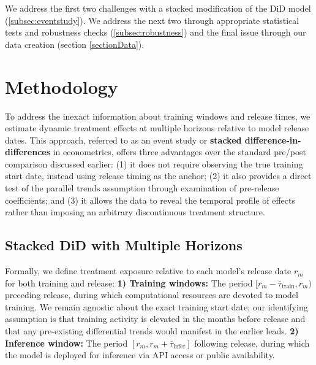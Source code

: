 \documentclass[a4paper,fleqn,longmktitle]{cas-sc}
\theoremstyle{plain}
\theoremstyle{definition}
\begin{document}
We address the first two challenges with a stacked modification of the DiD model (\autoref{subsec:eventstudy}). We address the next two through appropriate statistical tests and robustness checks (\autoref{subsec:robustness}) and the final issue through our data creation (section \ref{sectionData}). 


\section{Methodology} 

To address the inexact information about training windows and release times, we estimate dynamic treatment effects at multiple horizons relative to model release dates. This approach, referred to as an event study or \textbf{stacked difference-in-differences} in econometrics, offers three advantages over the standard pre/post comparison discussed earlier: (1) it does not require observing the true training start date, instead using release timing as the anchor; (2) it also provides a direct test of the parallel trends assumption through examination of pre-release coefficients; and (3) it allows the data to reveal the temporal profile of effects rather than imposing an arbitrary discontinuous treatment structure.

\subsection{Stacked DiD with Multiple Horizons}%
\label{subsec:eventstudy}
Formally, we define treatment exposure relative to each model's release date $r_m$ for both training and release: \textbf{1) Training windows:} The period $[r_m - \bar{\tau}_{\text{train}}, r_m)$ preceding release, during which computational resources are devoted to model training. We remain agnostic about the exact training start date; our identifying assumption is that training activity is elevated in the months before release and that any pre-existing differential trends would manifest in the earlier leads. \textbf{2) Inference window:} The period $[r_m, r_m + \bar{\tau}_{\text{infer}}]$ following release, during which the model is deployed for inference via API access or public availability.
\end{document}
